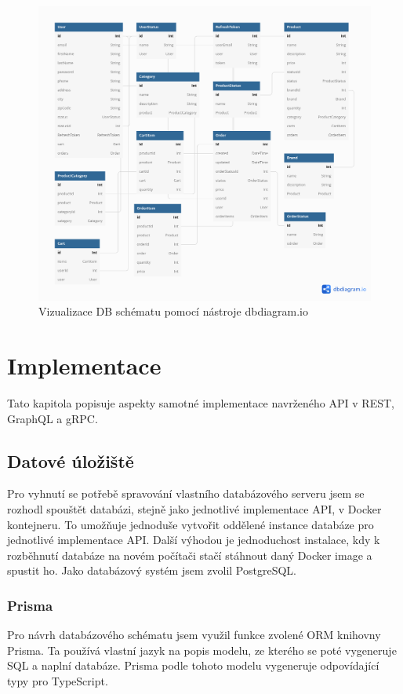 \documentclass[thesis=M,czech]{FITthesis}[2019/12/23]
\begin{document}
\begin{figure}[h]
  \centerline{\includegraphics[scale=0.45, angle=90]{img/schema-dbdiagram.png}}
  \caption{Vizualizace DB schématu pomocí nástroje dbdiagram.io}
	\label{schema-dbdiagram}
\end{figure}

\chapter{Implementace}
Tato kapitola popisuje aspekty samotné implementace navrženého API v REST, GraphQL a gRPC.

\section{Datové úložiště}
Pro vyhnutí se potřebě spravování vlastního databázového serveru jsem se rozhodl spouštět databázi, stejně jako jednotlivé implementace API, v Docker kontejneru. To umožňuje jednoduše vytvořit oddělené instance databáze pro jednotlivé implementace API. Další výhodou je jednoduchost instalace, kdy k rozběhnutí databáze na novém počítači stačí stáhnout daný Docker image a spustit ho. Jako databázový systém jsem zvolil PostgreSQL.

\subsection{Prisma}
Pro návrh databázového schématu jsem využil funkce zvolené ORM knihovny Prisma. Ta používá vlastní jazyk na popis modelu, ze kterého se poté vygeneruje SQL a naplní databáze. Prisma podle tohoto modelu vygeneruje odpovídající typy pro TypeScript.
\end{document}
